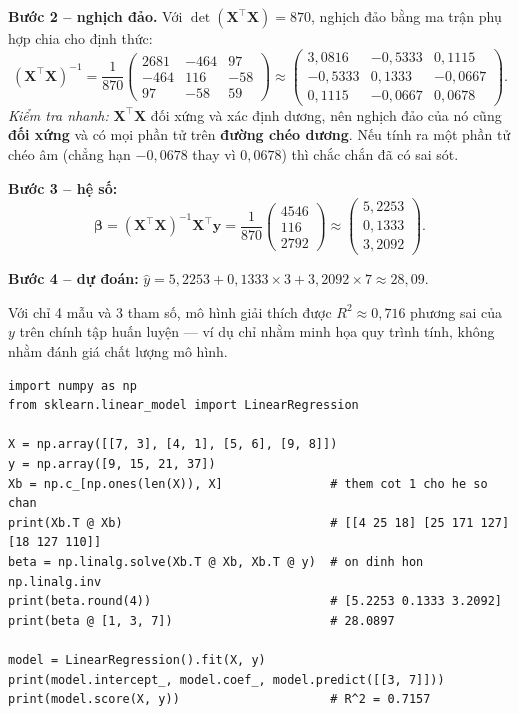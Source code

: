 \noindent\textbf{Bước 2 -- nghịch đảo.} Với $\det(\mathbf{X}^\top\mathbf{X}) = 870$, nghịch đảo bằng ma trận phụ hợp chia cho định thức:
\[
    (\mathbf{X}^\top\mathbf{X})^{-1} = \frac{1}{870}\begin{pmatrix} 2681 & -464 & 97 \\ -464 & 116 & -58 \\ 97 & -58 & 59 \end{pmatrix}
    \approx \begin{pmatrix} 3{,}0816 & -0{,}5333 & 0{,}1115 \\ -0{,}5333 & 0{,}1333 & -0{,}0667 \\ 0{,}1115 & -0{,}0667 & 0{,}0678 \end{pmatrix}.
\]
\textit{Kiểm tra nhanh:} $\mathbf{X}^\top\mathbf{X}$ đối xứng và xác định dương, nên nghịch đảo của nó cũng \textbf{đối xứng} và có mọi phần tử trên \textbf{đường chéo dương}. Nếu tính ra một phần tử chéo âm (chẳng hạn $-0{,}0678$ thay vì $0{,}0678$) thì chắc chắn đã có sai sót.

\noindent\textbf{Bước 3 -- hệ số:}
\[
    \boldsymbol{\beta} = (\mathbf{X}^\top\mathbf{X})^{-1}\mathbf{X}^\top\mathbf{y}
    = \frac{1}{870}\begin{pmatrix} 4546 \\ 116 \\ 2792 \end{pmatrix}
    \approx \begin{pmatrix} 5{,}2253 \\ 0{,}1333 \\ 3{,}2092 \end{pmatrix}.
\]

\noindent\textbf{Bước 4 -- dự đoán:} $\hat{y} = 5{,}2253 + 0{,}1333 \times 3 + 3{,}2092 \times 7 \approx 28{,}09$.

Với chỉ 4 mẫu và 3 tham số, mô hình giải thích được $R^2 \approx 0{,}716$ phương sai của $y$ trên chính tập huấn luyện --- ví dụ chỉ nhằm minh họa quy trình tính, không nhằm đánh giá chất lượng mô hình.

\begin{lstlisting}[caption={Kiểm tra ví dụ phương trình chuẩn}]
import numpy as np
from sklearn.linear_model import LinearRegression

X = np.array([[7, 3], [4, 1], [5, 6], [9, 8]])
y = np.array([9, 15, 21, 37])
Xb = np.c_[np.ones(len(X)), X]               # them cot 1 cho he so chan
print(Xb.T @ Xb)                             # [[4 25 18] [25 171 127] [18 127 110]]
beta = np.linalg.solve(Xb.T @ Xb, Xb.T @ y)  # on dinh hon np.linalg.inv
print(beta.round(4))                         # [5.2253 0.1333 3.2092]
print(beta @ [1, 3, 7])                      # 28.0897

model = LinearRegression().fit(X, y)
print(model.intercept_, model.coef_, model.predict([[3, 7]]))
print(model.score(X, y))                     # R^2 = 0.7157
\end{lstlisting}


